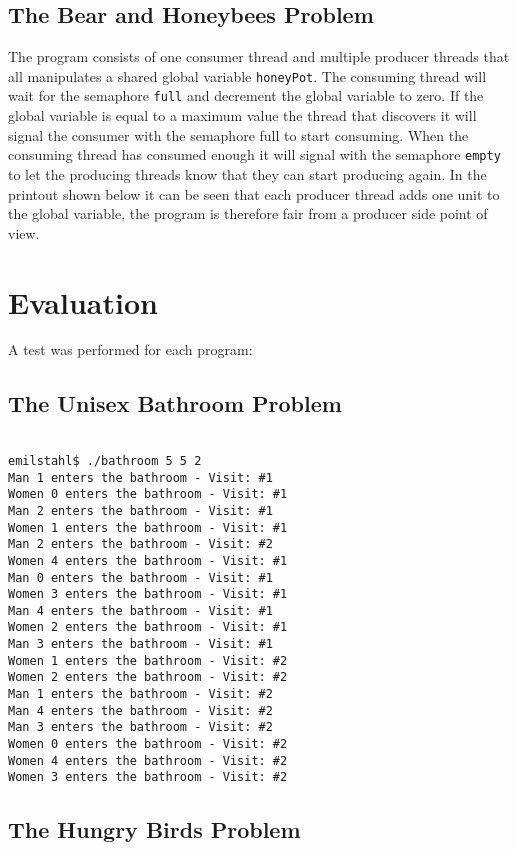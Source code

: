 \documentclass{article}
\begin{document}
\subsection{The Bear and Honeybees Problem}
The program consists of one consumer thread and multiple producer threads that all manipulates a shared global variable \texttt{honeyPot}. The consuming thread will wait for the semaphore \texttt{full} and decrement the global variable to zero. If the global variable is equal to a maximum value the thread that discovers it will signal the consumer with the semaphore full to start consuming. When the consuming thread has consumed enough it will signal with the semaphore \texttt{empty} to let the producing threads know that they can start producing again. In the printout shown below it can be seen that each producer thread adds one unit to the global variable, the program is therefore fair from a producer side point of view.


\clearpage
\section{Evaluation}

A test was performed for each program:

\subsection{The Unisex Bathroom Problem}
\begin{verbatim}

emilstahl$ ./bathroom 5 5 2
Man 1 enters the bathroom - Visit: #1
Women 0 enters the bathroom - Visit: #1
Man 2 enters the bathroom - Visit: #1
Women 1 enters the bathroom - Visit: #1
Man 2 enters the bathroom - Visit: #2
Women 4 enters the bathroom - Visit: #1
Man 0 enters the bathroom - Visit: #1
Women 3 enters the bathroom - Visit: #1
Man 4 enters the bathroom - Visit: #1
Women 2 enters the bathroom - Visit: #1
Man 3 enters the bathroom - Visit: #1
Women 1 enters the bathroom - Visit: #2
Women 2 enters the bathroom - Visit: #2
Man 1 enters the bathroom - Visit: #2
Man 4 enters the bathroom - Visit: #2
Man 3 enters the bathroom - Visit: #2
Women 0 enters the bathroom - Visit: #2
Women 4 enters the bathroom - Visit: #2
Women 3 enters the bathroom - Visit: #2
\end{verbatim}

\subsection{The Hungry Birds Problem}
\end{document}

